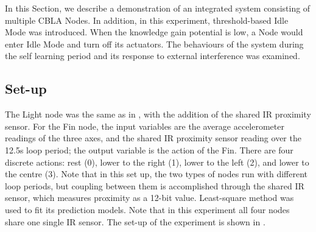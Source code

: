 In this Section, we describe a demonstration of an integrated system consisting of multiple CBLA Nodes. In addition, in this experiment, threshold-based Idle Mode was introduced. When the knowledge gain potential is low, a Node would enter Idle Mode and turn off its actuators. The behaviours of the system during the self learning period and its response to external interference was examined.

\subsection{Set-up}
The Light node was the same as in , with the addition of the shared IR proximity sensor. For the Fin node, the input variables are the average accelerometer readings of the three axes, and the shared IR proximity sensor reading over the 12.5s loop period; the output variable is the action of the Fin. There are four discrete actions: rest (0), lower to the right (1), lower to the left (2), and lower to the centre (3). Note that in this set up, the two types of nodes run with different loop periods, but coupling between them is accomplished through the shared IR sensor, which measures proximity as a 12-bit value. Least-square method was used to fit its prediction models. Note that in this experiment all four nodes share one single IR sensor. The set-up of the experiment is shown in .


